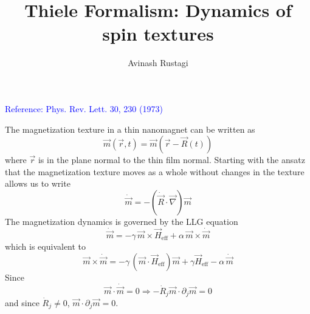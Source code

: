 \documentclass[aps,prb,onecolumn,notitlepage,showpacs,floatfix,superscriptaddress]{revtex4-1}
\newcommand{\mrm}[1]{\mathrm{#1}}
\begin{document}
\title{Thiele Formalism: Dynamics of spin textures}

\author{Avinash Rustagi}
%

\maketitle
%
\noindent \textcolor{blue}{Reference: Phys. Rev. Lett. 30, 230 (1973)}
\vspace{0.2in}

\noindent The magnetization texture in a thin nanomagnet can be written as
\begin{equation}
\vec{m}(\vec{r},t) = \vec{m}(\vec{r}-\vec{R}(t))
\end{equation}
where $\vec{r}$ is in the plane normal to the thin film normal. Starting with the ansatz that the magnetization texture moves as a whole without changes in the texture allows us to write 
\begin{equation}
\dot{\vec{m}} = - (\dot{\vec{R}}\cdot \vec{\nabla}) \vec{m}
\end{equation}
The magnetization dynamics is governed by the LLG equation
\begin{equation}
\dot{\vec{m}} = -\gamma \, \vec{m} \times \vec{H}_\mrm{eff} + \alpha \, \vec{m} \times \dot{\vec{m}}
\end{equation}
which is equivalent to
\begin{equation}
\vec{m} \times \dot{\vec{m}} = -\gamma \, (\vec{m} \cdot \vec{H}_\mrm{eff}) \vec{m} + \gamma \vec{H}_\mrm{eff} - \alpha \, \dot{\vec{m}}
\end{equation}
Since
\begin{equation}
\vec{m} \cdot \dot{\vec{m}}= 0 \Rightarrow - \dot{R}_j \vec{m} \cdot \partial_j \vec{m} = 0
\end{equation}
and since $\dot{R}_j \neq 0$, $\vec{m} \cdot \partial_j \vec{m} = 0$.\\
\end{document}
